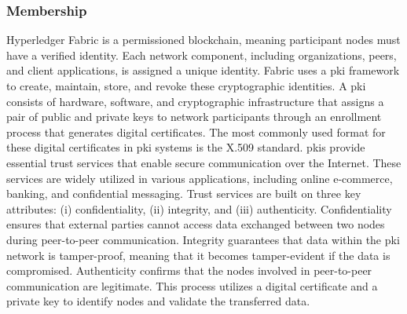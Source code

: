 \documentclass[conference]{IEEEtran}
\begin{document}
\subsubsection{Membership}
Hyperledger Fabric is a permissioned blockchain, meaning participant nodes must have a verified identity. Each network component, including organizations, peers, and client applications, is assigned a unique identity. Fabric uses a \ac{pki} framework to create, maintain, store, and revoke these cryptographic identities. A \ac{pki} consists of hardware, software, and cryptographic infrastructure that assigns a pair of public and private keys to network participants through an enrollment process that generates digital certificates. The most commonly used format for these digital certificates in \ac{pki} systems is the X.509 standard. \ac{pki}s provide essential trust services that enable secure communication over the Internet. These services are widely utilized in various applications, including online e-commerce, banking, and confidential messaging. Trust services are built on three key attributes: (i) confidentiality, (ii) integrity, and (iii) authenticity.  Confidentiality ensures that external parties cannot access data exchanged between two nodes during peer-to-peer communication. Integrity guarantees that data within the \ac{pki} network is tamper-proof, meaning that it becomes tamper-evident if the data is compromised. Authenticity confirms that the nodes involved in peer-to-peer communication are legitimate. This process utilizes a digital certificate and a private key to identify nodes and validate the transferred data. \\
\end{document}
